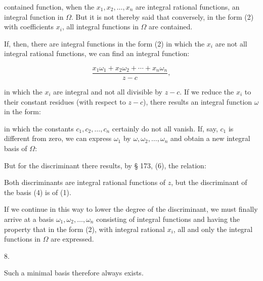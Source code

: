 contained function, when the $x_1, x_2, \ldots, x_n$ are integral rational
functions, an integral function in $\Omega$. But it is not thereby
said that conversely, in the form (2) with  coefficients
 $x_i$, all integral functions in $\Omega$ are contained.

If, then, there are integral functions in the form (2) in which the
$x_i$ are not all integral rational functions, we can find an
integral function:

\[
\frac{x_1 \omega_1 + x_2 \omega_2 + \cdots + x_n \omega_n}{z - c},
\]

in which the $x_i$ are integral and not all divisible by $z - c$.
If we reduce the $x_i$ to their constant residues (with respect to $z - c$),
there results an integral function $\omega$ in the form:


in which the constants $c_1, c_2, \ldots, c_n$ certainly do not all vanish.
If, say, $c_1$ is different from zero, we can express $\omega_1$
by $\omega, \omega_2, \ldots, \omega_n$ and obtain a new integral
 basis of $\Omega$:


But for the discriminant there results, by § 173, (6), the
relation:


Both discriminants are integral rational functions of $z$,
but the discriminant of the basis (4) is of  (1).

If we continue in this way to lower the degree of the
 discriminant, we must finally arrive at a basis $\omega_1, \omega_2, \ldots, \omega_n$
consisting of integral functions and having the property that in the form (2), with
integral rational $x_i$, all and only the integral functions in $\Omega$ are expressed.

8. 



Such a minimal basis therefore always exists.

